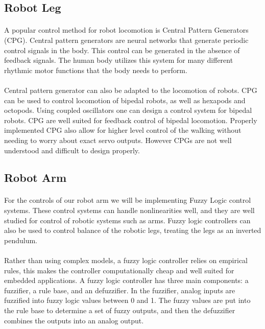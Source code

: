 \documentclass[titlepage,letterpaper,12pt]{article}
\begin{document}
\subsection{Robot Leg}
\paragraph{}A popular control method for robot locomotion is Central Pattern
Generators (CPG). Central pattern generators are neural networks that generate
periodic control signals in the body. This control can be generated in the
absence of feedback signals. The human body utilizes this
system for many different rhythmic motor functions that the body needs to
perform\cite{cpggeneral}.

\paragraph{}Central pattern generator can also be adapted to the locomotion of
robots. CPG can be used to control locomotion of bipedal robots, as well as
hexapods and octopods. Using coupled oscillators one can design a control system
for bipedal robots. CPG are well suited for feedback control of bipedal
locomotion. Properly implemented CPG also allow for higher level control of the
walking without needing to worry about exact servo outputs. However CPGs are not
well understood and difficult to design properly\cite{Ijspeert2008}.

\subsection{Robot Arm}
\paragraph{}For the controls of our robot arm we will be implementing Fuzzy
Logic control systems. These control systems can handle nonlinearities well, and
they are well studied for control of robotic systems such as
arms\cite{Scharf1985}.  Fuzzy logic controllers can also be used to control
balance of the robotic legs, treating the legs as an inverted
pendulum\cite{hwang1992stability}.

\paragraph{}Rather than using complex models, a fuzzy logic controller relies on
empirical rules, this makes the controller computationally cheap and well suited
for embedded applications. A fuzzy logic controller has three main components: a
fuzzifier, a rule base, and an defuzzifier. In the fuzzifier, analog inputs are
fuzzified into fuzzy logic values between 0 and 1. The fuzzy values are put into
the rule base to determine a set of fuzzy outputs, and then the defuzzifier
combines the outputs into an analog output\cite{Mailah2000}.
\end{document}
